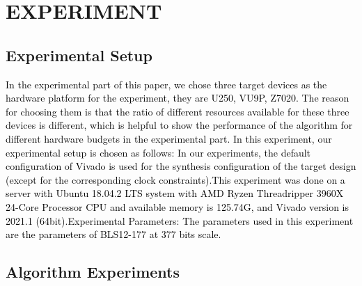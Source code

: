 \documentclass[conference]{IEEEtran}
\begin{document}




\section{EXPERIMENT}

\subsection{Experimental Setup}

\textcolor{black}{
In the experimental part of this paper, we chose three target devices as the hardware platform for the experiment, they are U250, VU9P, Z7020. The reason for choosing them is that the ratio of different resources available for these three devices is different, which is helpful to show the performance of the algorithm for different hardware budgets in the experimental part. In this experiment, our experimental setup is chosen as follows: 
In our experiments, the default configuration of Vivado is used for the synthesis configuration of the target design  (except for the corresponding clock constraints).This experiment was done on a server with Ubuntu 18.04.2 LTS system with AMD Ryzen Threadripper 3960X 24-Core Processor CPU and available memory is 125.74G, and Vivado version is 2021.1 (64bit).Experimental Parameters: The parameters used in this experiment are the parameters of BLS12-177 at 377 bits scale.
}


\subsection{Algorithm Experiments}
\end{document}
